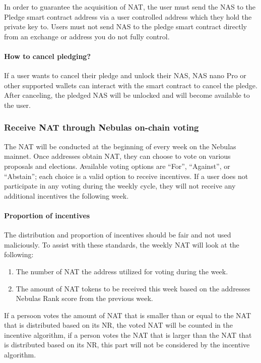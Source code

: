 In order to guarantee the acquisition of NAT, the user must send the NAS to the Pledge smart contract address via a user controlled address which they hold the private key to. Users must not send NAS to the pledge smart contract directly from an exchange or address you do not fully control.


\paragraph{How to cancel pledging?}

If a user wants to cancel their pledge and unlock their NAS, NAS nano Pro or other supported wallets can interact with the smart contract to cancel the pledge. After canceling, the pledged NAS will be unlocked and will become available to the user.

\subsubsection{Receive NAT through Nebulas on-chain voting}

The NAT will be conducted at the beginning of every week on the Nebulas
mainnet. Once addresses obtain NAT, they can choose to vote on various
proposals and elections. Available voting options are ``For'', ``Against'', or
``Abstain''; each choice is a valid option to receive incentives. If a user does not participate in any voting during the weekly cycle, they will not receive any additional incentives the following week.


\paragraph{Proportion of incentives}

The distribution and proportion of incentives should be fair and not used maliciously. To assist with these standards, the weekly NAT will look at the following:

\begin{enumerate}
	\item The number of NAT the address utilized for voting during the week.
	\item The amount of NAT tokens to be received this week based on the addresses Nebulas Rank score from the previous week.
\end{enumerate}

If a persoon votes the amount of NAT that is smaller than or equal to the NAT that is distributed based on its NR, the voted NAT will be counted in the incentive algorithm, if a person votes the NAT that is larger than the NAT that is distributed based on its NR, this part will not be considered by the incentive algorithm. 

